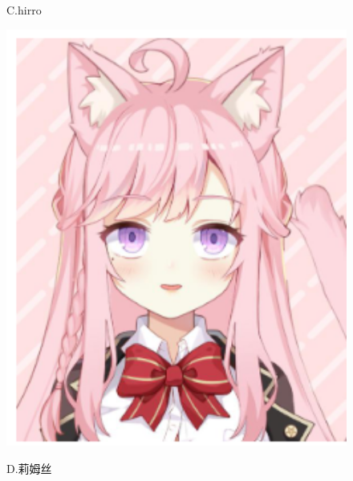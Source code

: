\documentclass[a4paper]{article}
\begin{document}
\begin{figure}[ht]
\begin{minipage}{0.24\linewidth}
        \centerline{C.hirro}
    \end{minipage}
    \begin{minipage}{0.24\linewidth}
        \centerline{\includegraphics[width=1\textwidth]{lim.PNG}}
        \centerline{D.莉姆丝}
    \end{minipage}
\end{figure}
\end{document}
